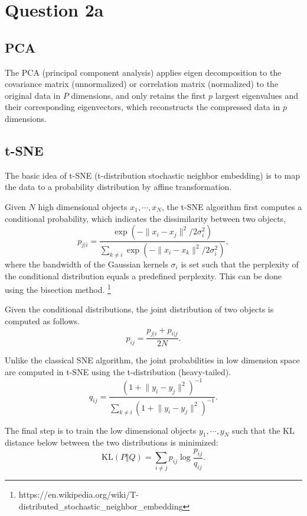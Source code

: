 \documentclass{article}
\begin{document}
\section*{Question 2a}
{
    \subsection*{PCA}
    {
        The PCA (principal component analysis) applies eigen decomposition to the covariance matrix (unnormalized) or correlation matrix (normalized) to the original data in $P$ dimensions, and only retains the first $p$ largest eigenvalues and their corresponding eigenvectors, which reconstructs the compressed data in $p$ dimensions. 
    }

    \subsection*{t-SNE}
    {
        The basic idea of t-SNE (t-distribution stochastic neighbor embedding) is to map the data to a probability distribution by affine transformation. 

        Given $N$ high dimensional objects $x_1, \cdots, x_N$, the t-SNE algorithm first computes a conditional probability, 
        which indicates the dissimilarity between two objects, 
        $$p_{j|i} = \frac{ \exp{(- \lVert x_i - x_j \rVert^2 / 2\sigma_i^2)} }{ \sum_{k\neq i} \exp{(- \lVert x_i - x_k \rVert^2 / 2\sigma_i^2)} },$$
        where the bandwidth of the Gaussian kernels $\sigma_i$ is set such that the perplexity of the conditional distribution equals a predefined perplexity. 
        This can be done using the bisection method. \footnote{https://en.wikipedia.org/wiki/T-distributed\_stochastic\_neighbor\_embedding}

        Given the conditional distributions, the joint distribution of two objects is computed as follows.
        $$p_{ij} = \frac{ p_{j|i} + p_{i|j} }{2N}.$$

        Unlike the classical SNE algorithm, the joint probabilities in low dimension space are computed in t-SNE using the t-distribution (heavy-tailed).
        $$q_{ij} = \frac{ (1 + \lVert y_i - y_j \rVert^2 )^{-1} }{ \sum_{k\neq i} (1 + \lVert y_i - y_j \rVert^2 )^{-1} }.$$

        The final step is to train the low dimensional objects $y_1, \cdots, y_N$ such that the KL distance below between the two distributions is minimized:
        $$\mathrm{KL}(P\Vert Q) = \sum_{i\neq j} p_{ij} \log{\frac{p_{ij}}{q_{ij}}}.$$

}}
\end{document}
